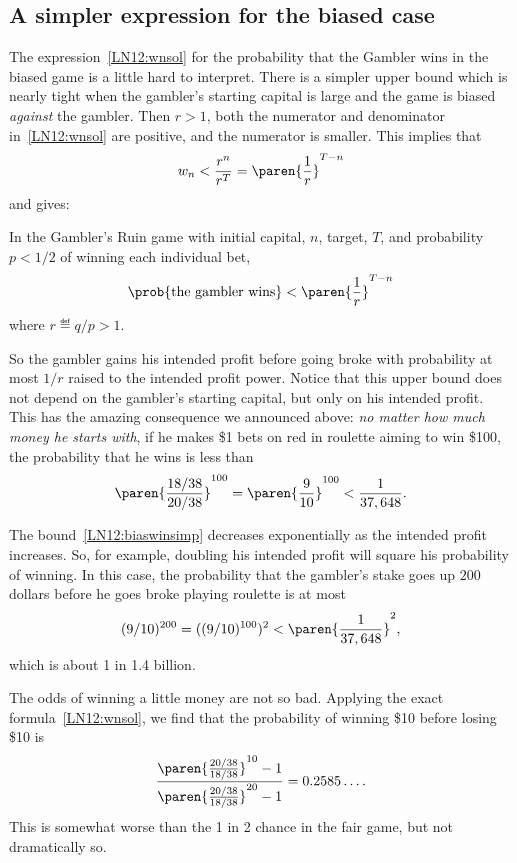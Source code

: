 \subsection{A simpler expression for the biased case}
The expression~\eqref{LN12:wnsol} for the probability that the Gambler
wins in the biased game is a little hard to interpret.  There is a
simpler upper bound which is nearly tight when the gambler's starting
capital is large and the game is biased \emph{against} the gambler.
Then $r >1$, both the numerator and denominator
in~\eqref{LN12:wnsol} are positive, and the numerator is smaller.
This implies that
\[
w_n < \frac{r^n}{r^T} = \paren{\frac{1}{r}}^{T-n}
\]
and gives:
\begin{corollary}\label{LN12:biaswincor}
  In the Gambler's Ruin game with initial capital, $n$, target, $T$,
  and probability $p < 1/2$ of winning each individual bet,
\begin{equation}\label{LN12:biaswinsimp}
\prob{\text{the gambler wins}} <  \paren{\frac{1}{r}}^{T-n} %
\end{equation}
where $r \eqdef q/p > 1$.
\end{corollary}

So the gambler gains his intended profit before going broke with
probability at most $1/r$ raised to the intended profit power.
Notice that this upper bound does not depend on the gambler's starting
capital, but only on his intended profit.  This has the amazing
consequence we announced above: \emph{no matter how much money he
  starts with}, if he makes \$1 bets on red in roulette aiming to win
\$100, the probability that he wins is less than
\[
\paren{\frac{18/38}{20/38}}^{100} = \paren{\frac{9}{10}}^{100} < \frac{1}{37,648}.
\]

The bound~\eqref{LN12:biaswinsimp} decreases exponentially as the
intended profit increases.  So, for example, doubling his intended
profit will square his probability of winning.  In this case, the
probability that the gambler's stake goes up $200$ dollars before he
goes broke playing roulette is at most
\[
(9/10)^{200} = ((9/10)^{100})^2 < \paren{\frac{1}{37,648}}^2,
\]
which is about 1 in 1.4 billion.

\begin{editingnotes}

The odds of winning a little money are not so bad.
Applying the exact formula~\eqref{LN12:wnsol}, we find that the probability
of winning \$10 before losing \$10 is
\[
\frac{\paren{\frac{20/38}{18/38}}^{10} - 1}
              {\paren{\frac{20/38}{18/38}}^{20} - 1}
  = 0.2585\dots.
\]
This is somewhat worse than the 1 in 2 chance in the fair game, but not
dramatically so.

\end{editingnotes}


